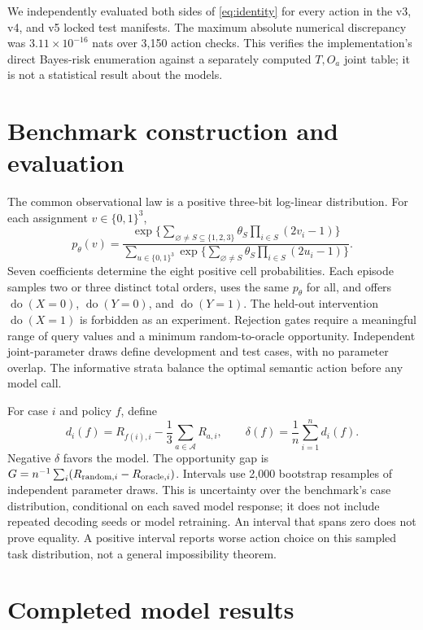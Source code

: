 \documentclass[10pt]{article}
\newcommand{\doop}{\operatorname{do}}
\begin{document}
We independently evaluated both sides of \eqref{eq:identity} for every action in the v3, v4, and v5 locked test manifests. The maximum absolute numerical discrepancy was $3.11\times10^{-16}$ nats over 3,150 action checks. This verifies the implementation's direct Bayes-risk enumeration against a separately computed $T,O_a$ joint table; it is not a statistical result about the models.

\section{Benchmark construction and evaluation}
The common observational law is a positive three-bit log-linear distribution. For each assignment $v\in\{0,1\}^3$,
\begin{equation}
 p_{\theta}(v)=\frac{\exp\{\sum_{\varnothing\ne S\subseteq\{1,2,3\}}
 \theta_S\prod_{i\in S}(2v_i-1)\}}
 {\sum_{u\in\{0,1\}^3}\exp\{\sum_{\varnothing\ne S}
 \theta_S\prod_{i\in S}(2u_i-1)\}}.
 \label{eq:ising}
\end{equation}
Seven coefficients determine the eight positive cell probabilities. Each episode samples two or three distinct total orders, uses the same $p_\theta$ for all, and offers $\doop(X=0)$, $\doop(Y=0)$, and $\doop(Y=1)$. The held-out intervention $\doop(X=1)$ is forbidden as an experiment. Rejection gates require a meaningful range of query values and a minimum random-to-oracle opportunity. Independent joint-parameter draws define development and test cases, with no parameter overlap. The informative strata balance the optimal semantic action before any model call.

For case $i$ and policy $f$, define
\begin{equation}
 d_i(f)=R_{f(i),i}-\frac{1}{3}\sum_{a\in\mathcal A}R_{a,i},
 \qquad
 \delta(f)=\frac{1}{n}\sum_{i=1}^{n}d_i(f).
 \label{eq:contrast}
\end{equation}
Negative $\delta$ favors the model. The opportunity gap is
$G=n^{-1}\sum_i(R_{{\rm random},i}-R_{{\rm oracle},i})$.
Intervals use 2,000 bootstrap resamples of independent parameter draws. This is uncertainty over the benchmark's case distribution, conditional on each saved model response; it does not include repeated decoding seeds or model retraining. An interval that spans zero does not prove equality. A positive interval reports worse action choice on this sampled task distribution, not a general impossibility theorem.

\section{Completed model results}
\end{document}

